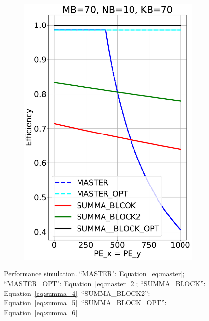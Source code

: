 \begin{figure}[t!]
\begin{subfigure}{0.32\columnwidth}
    \includegraphics[width=\linewidth]{figures/efficiency_cost_block_70_10_70.pdf}
  \end{subfigure}
  \caption{Performance simulation. ``MASTER": Equation~\ref{eq:master}; ``MASTER\_OPT": Equation~\ref{eq:master_2}; ``SUMMA\_BLOCK'': Equation~\ref{eq:summa_4}; ``SUMMA\_BLOCK2'': Equation~\ref{eq:summa_5}; ``SUMMA\_BLOCK\_OPT'': Equation~\ref{eq:summa_6}.}
  \label{fig:gemm_perf_simulate_block}
\end{figure}
 



